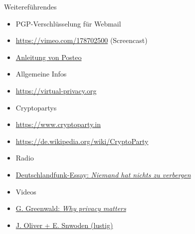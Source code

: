 \documentclass{beamer}
\begin{document}
\begin{frame}{Weitereführendes}

\begin{itemize}
\item[] \hspace{-2em} PGP-Verschlüsselung für Webmail
  \item \url{https://vimeo.com/178702500} (Screencast)\\[2mm]
  \item \href{https://posteo.de/hilfe/wie-installiere-ich-eine-ende-zu-ende-verschluesselung-pgp-im-browser}{Anleitung von Posteo}
  \item[] \hspace{-2em} Allgemeine Infos
  \item \url{https://virtual-privacy.org}
  \item[] \hspace{-2em} Cryptopartys
  \item \url{https://www.cryptoparty.in}
  \item \url{https://de.wikipedia.org/wiki/CryptoParty}
  \item[] \hspace{-2em} Radio
  \item \href{http://www.deutschlandfunk.de/ein-essay-ueber-geheimnisse-niemand-hat-nichts-zu-verbergen.1184.de.html?dram:article_id=395252}{Deutschlandfunk-Essay: \textit{Niemand hat nichts zu verbergen}}
  \item[] \hspace{-2em} Videos
  \item \href{https://www.ted.com/talks/glenn_greenwald_why_privacy_matters}{G. Greenwald: \textit{Why privacy matters}}
  \item \href{https://www.youtube.com/watch?v=XEVlyP4_11M}{J. Oliver + E. Snwoden (lustig)}
\end{itemize}
\end{frame}
\end{document}
